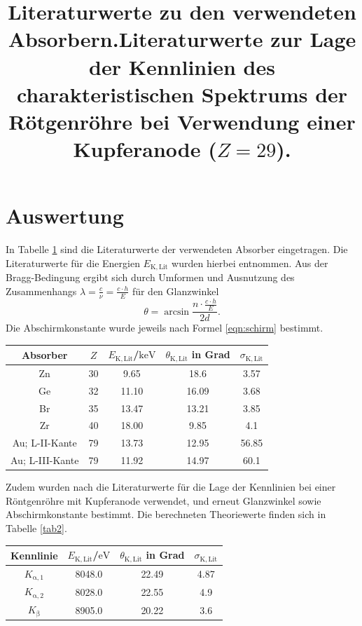 \section{Auswertung}
\label{sec:Auswertung}
In Tabelle \ref{tab:lit} sind die Literaturwerte der verwendeten Absorber eingetragen.
Die Literaturwerte für die Energien $E_\mathrm{K,Lit}$ wurden hierbei \cite{lit} entnommen.
Aus der Bragg-Bedingung ergibt sich durch Umformen und Ausnutzung des Zusammenhangs $\lambda=\frac{c}{\nu}=\frac{c\cdot h}{E}$ für den Glanzwinkel
\begin{equation}
	\theta=\arcsin{\frac{n\cdot \frac{c\cdot h}{E}}{2d}} \text{.}
\end{equation}
Die Abschirmkonstante wurde jeweils nach Formel \eqref{eqn:schirm} bestimmt.
\begin{table}
	\title{Literaturwerte zu den verwendeten Absorbern.}
	\label{tab:lit}
	\centering
\begin{tabular}{ccccc}
\toprule
Absorber & $Z$ & $E_\mathrm{K,Lit}$/$\si{\kilo\electronvolt}$ & $\theta_\mathrm{K,Lit}$ in Grad&$\sigma_\mathrm{K,Lit}$ \\
\midrule
Zn&30 & 9.65 & 18.6 & 3.57 \\
Ge&32 & 11.10 & 16.09 & 3.68 \\
Br&35 & 13.47& 13.21 & 3.85 \\
Zr&40 & 18.00 & 9.85 & 4.1 \\
Au; L-II-Kante&79 & 13.73 & 12.95 & 56.85 \\
Au; L-III-Kante&79 & 11.92 & 14.97 & 60.1 \\
\bottomrule
\end{tabular}
\end{table}

Zudem wurden nach \cite{UniG} die Literaturwerte für die Lage der Kennlinien bei einer Röntgenröhre mit Kupferanode verwendet, und erneut Glanzwinkel sowie Abschirmkonstante bestimmt. Die berechneten Theoriewerte finden sich in Tabelle \ref{tab2}.
\begin{table}
	\title{Literaturwerte zur Lage der Kennlinien des charakteristischen Spektrums der Rötgenröhre bei Verwendung einer Kupferanode ($Z=29$).}
	\centering
\begin{tabular}{cccc}
\toprule
 Kennlinie& $E_\mathrm{K,Lit}$/$\si{\electronvolt}$ & $\theta_\mathrm{K,Lit}$ in Grad&$\sigma_\mathrm{K,Lit}$ \\
\midrule
$K_\mathrm{\alpha,1}$& 8048.0 & 22.49 & 4.87 \\
$K_\mathrm{\alpha,2}$& 8028.0 & 22.55 & 4.9 \\
$K_\mathrm{\beta}$& 8905.0 & 20.22 & 3.6 \\
\bottomrule
\end{tabular}
\end{table}


